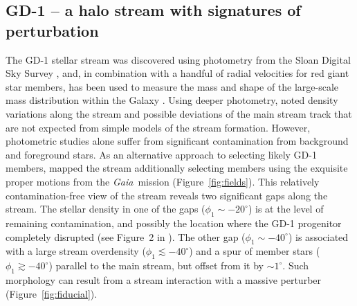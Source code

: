 \documentclass[12pt]{article}
\newcommand{\gaia}{\textsl{Gaia}}
\begin{document}
\subsection*{GD-1 -- a halo stream with signatures of perturbation}
The GD-1 stellar stream was discovered using photometry from the Sloan Digital Sky Survey \parencite{grillmair2006},
and, in combination with a handful of radial velocities for red giant star members, has been used to measure the mass and shape of the large-scale mass distribution within the Galaxy \parencite{koposov2010, bovy2016}.
Using deeper photometry, \textcite{deboer2018} noted density variations along the stream and possible deviations of the main stream track that are not expected from simple models of the stream formation.
However, photometric studies alone suffer from significant contamination from background and foreground stars.
As an alternative approach to selecting likely GD-1 members, \textcite{pwb2018} mapped the stream additionally selecting members using the exquisite proper motions from the \gaia\ mission (Figure~\ref{fig:fields}).
This relatively contamination-free view of the stream reveals two significant gaps along the stream.
The stellar density in one of the gaps ($\phi_1\sim-20^\circ$) is at the level of remaining contamination, and possibly the location where the GD-1 progenitor completely disrupted (see Figure~2 in \cite{pwb2018}).
The other gap ($\phi_1\sim-40^\circ$) is associated with a large stream overdensity ($\phi_1\lesssim-40^\circ$) and a spur of member stars ($\phi_1\gtrsim-40^\circ$) parallel to the main stream, but offset from it by $\sim1^\circ$.
Such morphology can result from a stream interaction with a massive perturber (Figure~\ref{fig:fiducial}).
\end{document}
